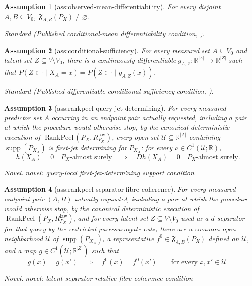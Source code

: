 \documentclass{article}
\newtheorem{assumption}{Assumption}
\begin{document}
\begin{assumption}[ass:observed-mean-differentiability]\label{ass:observed-mean-differentiability}
For every disjoint \(A,B\subseteq V_0\), \(\mathfrak F_{A,B}(P_X)\neq\varnothing\).
\par\smallskip\noindent\emph{Standard} (Published conditional-mean differentiability condition, \cite{PrashantEtAl2025Differentiable}).
\end{assumption}

\begin{assumption}[ass:conditional-sufficiency]\label{ass:conditional-sufficiency}
For every measured set \(A\subseteq V_0\) and latent set \(Z\subseteq V\setminus V_0\), there is a continuously differentiable \(g_{A,Z}:\mathbb R^{|A|}\to\mathbb R^{|Z|}\) such that \(P(Z\in\cdot\mid X_A=x)=P(Z\in\cdot\mid g_{A,Z}(x))\).
\par\smallskip\noindent\emph{Standard} (Published differentiable conditional-sufficiency condition, \cite{PrashantEtAl2025Differentiable}).
\end{assumption}

\begin{assumption}[ass:rankpeel-query-jet-determining]\label{ass:rankpeel-query-jet-determining}
For every measured predictor set \(A\) occurring in an endpoint pair actually requested, including a pair at which the procedure would otherwise stop, by the canonical deterministic execution of \(\operatorname{RankPeel}(P_X,R^{\mathrm{law}}_{P_X})\), every open set \(\mathcal U\subseteq\mathbb R^{|A|}\) containing \(\operatorname{supp}(P_{X_A})\) is first-jet determining for \(P_{X_A}\): for every \(h\in C^1(\mathcal U;\mathbb R)\),
\[
 h(X_A)=0\quad P_X\text{-almost surely}
 \quad\Longrightarrow\quad
 Dh(X_A)=0\quad P_X\text{-almost surely}.
\]
\par\smallskip\noindent\emph{Novel.} novel: query-local first-jet-determining support condition
\end{assumption}

\begin{assumption}[ass:rankpeel-separator-fibre-coherence]\label{ass:rankpeel-separator-fibre-coherence}
For every measured endpoint pair \((A,B)\) actually requested, including a pair at which the procedure would otherwise stop, by the canonical deterministic execution of \(\operatorname{RankPeel}(P_X,R^{\mathrm{law}}_{P_X})\), and for every latent set \(Z\subseteq V\setminus V_0\) used as a \(d\)-separator for that query by the restricted pure-surrogate cuts, there are a common open neighborhood \(\mathcal U\) of \(\operatorname{supp}(P_{X_A})\), a representative \(f^0\in\mathfrak F_{A,B}(P_X)\) defined on \(\mathcal U\), and a map \(g\in C^1(\mathcal U;\mathbb R^{|Z|})\) such that
\[
 g(x)=g(x')\quad\Longrightarrow\quad f^0(x)=f^0(x')
 \qquad\text{for every }x,x'\in\mathcal U.
\]
\par\smallskip\noindent\emph{Novel.} novel: latent separator-relative fibre-coherence condition
\end{assumption}
\end{document}
